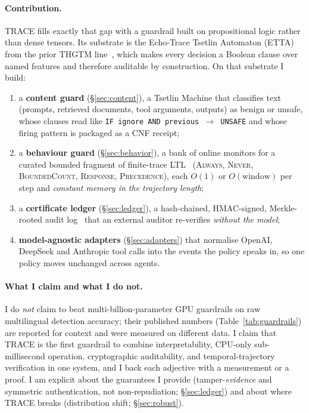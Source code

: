 \documentclass[11pt]{article}
\begin{document}
\paragraph{Contribution.} TRACE fills exactly that gap with a guardrail built on
propositional logic rather than dense tensors. Its substrate is the
Echo-Trace Tsetlin Automaton (ETTA) from the prior THGTM
line~\citep{debes2026thgtm}, which makes every decision a Boolean clause over
named features and therefore auditable by construction. On that substrate I
build:

\begin{enumerate}[leftmargin=1.4em]
\item a \textbf{content guard} (\S\ref{sec:content}), a Tsetlin Machine that
classifies text (prompts, retrieved documents, tool arguments, outputs) as
benign or unsafe, whose clauses read like \texttt{IF ignore AND previous
$\rightarrow$ UNSAFE} and whose firing pattern is packaged as a CNF receipt;
\item a \textbf{behaviour guard} (\S\ref{sec:behavior}), a bank of online
monitors for a curated bounded fragment of finite-trace
LTL~\citep{bauer2011ltl3,degiacomo2013ltlf} (\textsc{Always}, \textsc{Never},
\textsc{BoundedCount}, \textsc{Response}, \textsc{Precedence}), each $O(1)$ or
$O(\text{window})$ per step and \emph{constant memory in the trajectory length};
\item a \textbf{certificate ledger} (\S\ref{sec:ledger}), a hash-chained,
HMAC-signed, Merkle-rooted audit log~\citep{schneier1998securelogs,
crosby2009historytree,laurie2013ct,krawczyk1997hmac} that an external auditor
re-verifies \emph{without the model};
\item \textbf{model-agnostic adapters} (\S\ref{sec:adapters}) that normalise
OpenAI, DeepSeek and Anthropic tool calls into the events the policy speaks in,
so one policy moves unchanged across agents.
\end{enumerate}

\paragraph{What I claim and what I do not.} I do \emph{not} claim to beat
multi-billion-parameter GPU guardrails on raw multilingual detection accuracy;
their published numbers (Table~\ref{tab:guardrails}) are reported for context
and were measured on different data. I claim that TRACE is the first guardrail
to combine interpretability, CPU-only sub-millisecond operation, cryptographic
auditability, and temporal-trajectory verification in one system, and I back
each adjective with a measurement or a proof. I am explicit about the
guarantees I provide (tamper-\emph{evidence} and symmetric authentication, not
non-repudiation; \S\ref{sec:ledger}) and about where TRACE breaks
(distribution shift; \S\ref{sec:robust}).
\end{document}
